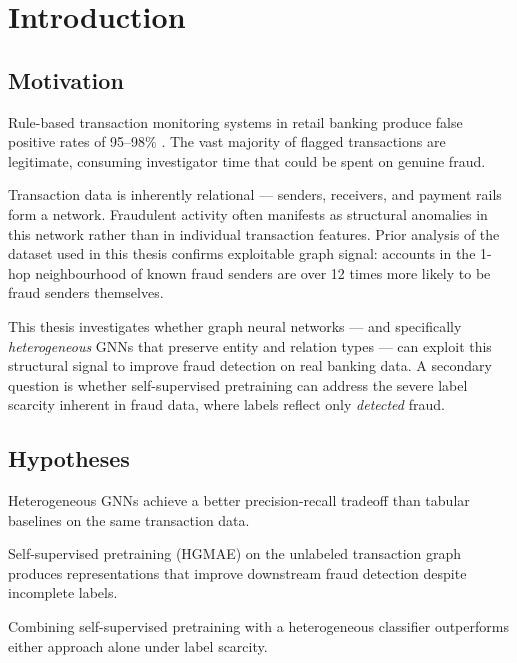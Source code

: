 \chapter{Introduction}
\label{chap:introduction}

\section{Motivation}
\label{sec:motivation}

Rule-based transaction monitoring systems in retail banking produce false positive rates of 95--98\% \citep{gerlings2023xai, cardoso2022laundrograph}. The vast majority of flagged transactions are legitimate, consuming investigator time that could be spent on genuine fraud.

Transaction data is inherently relational --- senders, receivers, and payment rails form a network. Fraudulent activity often manifests as structural anomalies in this network rather than in individual transaction features. Prior analysis of the dataset used in this thesis confirms exploitable graph signal: accounts in the 1-hop neighbourhood of known fraud senders are over 12 times more likely to be fraud senders themselves.

This thesis investigates whether graph neural networks --- and specifically \textit{heterogeneous} GNNs that preserve entity and relation types --- can exploit this structural signal to improve fraud detection on real banking data. A secondary question is whether self-supervised pretraining can address the severe label scarcity inherent in fraud data, where labels reflect only \textit{detected} fraud.

\section{Hypotheses}
\label{sec:hypotheses}

\begin{description}[style=nextline]
  \item[H1] Heterogeneous GNNs achieve a better precision-recall tradeoff than tabular baselines on the same transaction data.
  \item[H2] Self-supervised pretraining (HGMAE) on the unlabeled transaction graph produces representations that improve downstream fraud detection despite incomplete labels.
  \item[H3] Combining self-supervised pretraining with a heterogeneous classifier outperforms either approach alone under label scarcity.
\end{description}

